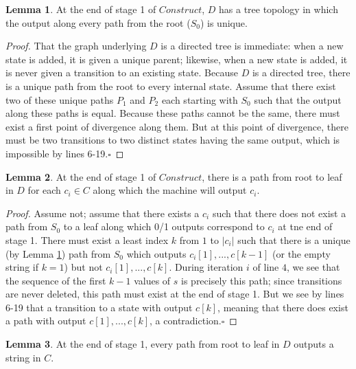 \documentclass{article}
\theoremstyle{definition}
\newtheorem{lemma}{Lemma}[section]
\begin{document}
\begin{lemma}
\label{ConstructL1}
At the end of stage 1 of $Construct$, $D$ has a tree topology in which the output 
along every path from the root ($S_0$) is unique.
\end{lemma}

\begin{proof}
That the graph underlying $D$ is a directed tree 
is immediate: when a new state is added, it is given a unique parent; likewise, when a 
new state is added, it is never given a transition to an existing state.  Because $D$ is a 
directed tree, there is a unique path from the root to every internal state.  Assume that there exist 
two of these unique paths $P_1$ and $P_2$ each starting with $S_0$ such that the output 
along these paths is equal.  
Because these paths cannot be the same, there must exist a first point of divergence along them. 
But at this point of divergence, there must be two transitions to two distinct states 
having the same output, which is impossible by lines 6-19.$\square$
\end{proof}

\begin{lemma}
\label{ConstructL2}
At the end of stage 1 of $Construct$, there is a path from root to leaf in $D$ 
for each $c_i \in C$ along which the machine will output $c_i$.
\end{lemma}

\begin{proof}
Assume not; assume that there exists
a $c_i$ such that there does not exist a path from $S_0$ to a leaf along 
which 0/1 outputs correspond to $c_i$ at tne end of stage 1.  There must exist a least index $k$ 
from $1$ to $\lvert c_i \rvert$ such that there is a unique (by Lemma \ref{ConstructL1}) 
path from $S_0$ which outputs 
$c_i[1],...,c[k-1]$ (or the empty string if $k=1$) but not $c_i[1],...,c[k]$.  
During iteration $i$ of line $4$, we see 
that the sequence of the first $k-1$ values of $s$ is precisely this path; since transitions 
are never deleted, this path must exist at the end of stage 1.  But we see by lines 6-19 
that a transition to a state with output $c[k]$, meaning that there does exist a path with 
output $c[1],...,c[k]$, a contradiction.$\square$
\end{proof}

\begin{lemma}
\label{ConstructL3}
At the end of stage 1, every path from root to leaf in $D$ outputs a string in 
$C$.
\end{lemma}
\end{document}
